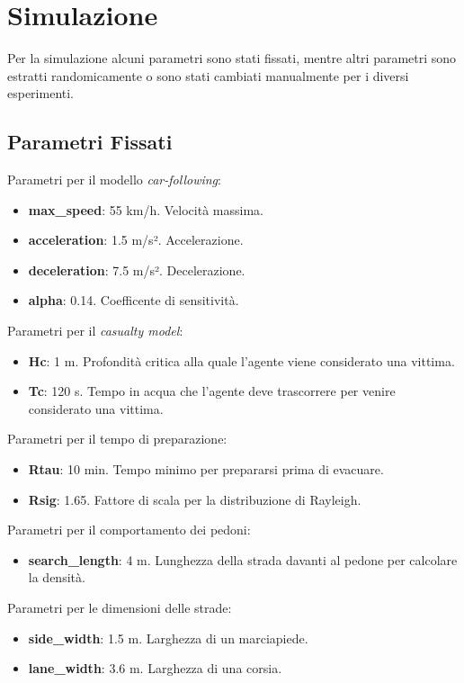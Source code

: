 \section{Simulazione}
\label{sec:simulazione}
Per la simulazione alcuni parametri sono stati fissati, mentre altri parametri sono estratti randomicamente 
o sono stati cambiati manualmente per i diversi esperimenti.

\subsection{Parametri Fissati}

Parametri per il modello \textit{car-following}:
\begin{itemize}
    \item \textbf{max\_speed}: 55 km/h. Velocità massima.
    \item \textbf{acceleration}: 1.5 m/s². Accelerazione.
    \item \textbf{deceleration}: 7.5 m/s². Decelerazione.
    \item \textbf{alpha}: 0.14. Coefficente di sensitività. 
\end{itemize}

\noindent
Parametri per il \textit{casualty model}:
\begin{itemize}
  \item \textbf{Hc}: 1 m. Profondità critica alla quale l'agente viene considerato una vittima.
  \item \textbf{Tc}: 120 s. Tempo in acqua che l'agente deve trascorrere per venire considerato una vittima. 
\end{itemize}

\noindent
Parametri per il tempo di preparazione:
\begin{itemize}
  \item \textbf{Rtau}: 10 min. Tempo minimo per prepararsi prima di evacuare.
  \item \textbf{Rsig}: 1.65. Fattore di scala per la distribuzione di Rayleigh.
\end{itemize}

\noindent
Parametri per il comportamento dei pedoni:
\begin{itemize}
  \item \textbf{search\_length}: 4 m. Lunghezza della strada davanti al pedone per calcolare la densità.
\end{itemize}

\noindent
Parametri per le dimensioni delle strade:
\begin{itemize}
  \item \textbf{side\_width}: 1.5 m. Larghezza di un marciapiede.
  \item \textbf{lane\_width}: 3.6 m. Larghezza di una corsia.
\end{itemize}

